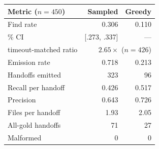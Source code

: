 \begin{tabular}{@{}lrr@{}}
\toprule
Metric ($n{=}450$) & Sampled & Greedy \\
\midrule
Find rate            & 0.306 & 0.110 \\
\quad 95\% CI        & [.273, .337] & --- \\
\quad timeout-matched ratio & \multicolumn{2}{r}{$2.65\times$ ($n{=}426$)} \\
\addlinespace
Emission rate        & 0.718 & 0.213 \\
Handoffs emitted     & 323 & \phantom{0}96 \\
\addlinespace
Recall per handoff   & 0.426 & 0.517 \\
Precision            & 0.643 & 0.726 \\
Files per handoff    & 1.93 & 2.05 \\
All-gold handoffs    & \phantom{0}71 & \phantom{0}27 \\
\addlinespace
Malformed            & \phantom{00}0 & \phantom{00}0 \\
\bottomrule
\end{tabular}
